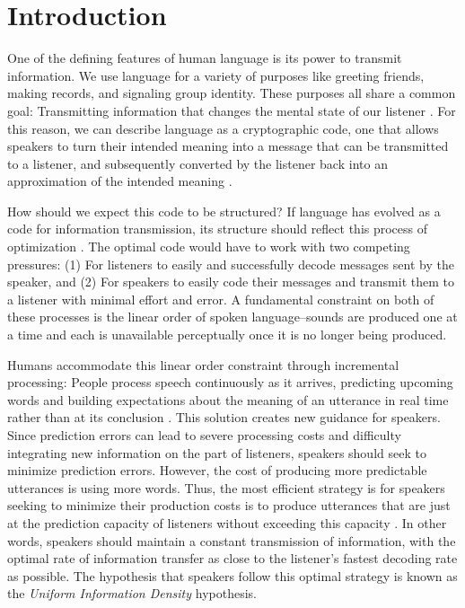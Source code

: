 \documentclass[entropy,article,submit,moreauthors,pdftex]{mdpi}
\begin{document}

\hypertarget{introduction}{%
\section{Introduction}\label{introduction}}

One of the defining features of human language is its power to transmit
information. We use language for a variety of purposes like greeting
friends, making records, and signaling group identity. These purposes
all share a common goal: Transmitting information that changes the
mental state of our listener \citep{austin1975}. For this reason, we can
describe language as a cryptographic code, one that allows speakers to
turn their intended meaning into a message that can be transmitted to a
listener, and subsequently converted by the listener back into an
approximation of the intended meaning \citep{shannon1948}.

How should we expect this code to be structured? If language has evolved
as a code for information transmission, its structure should reflect
this process of optimization \citep{anderson1989}. The optimal code
would have to work with two competing pressures: (1) For listeners to
easily and successfully decode messages sent by the speaker, and (2) For
speakers to easily code their messages and transmit them to a listener
with minimal effort and error. A fundamental constraint on both of these
processes is the linear order of spoken language--sounds are produced
one at a time and each is unavailable perceptually once it is no longer
being produced.

Humans accommodate this linear order constraint through incremental
processing: People process speech continuously as it arrives, predicting
upcoming words and building expectations about the meaning of an
utterance in real time rather than at its conclusion
\citep{kutas2011, tanenhaus1995, pickering2013}. This solution creates
new guidance for speakers. Since prediction errors can lead to severe
processing costs and difficulty integrating new information on the part
of listeners, speakers should seek to minimize prediction errors.
However, the cost of producing more predictable utterances is using more
words. Thus, the most efficient strategy is for speakers seeking to
minimize their production costs is to produce utterances that are just
at the prediction capacity of listeners without exceeding this capacity
\citep{aylett2004, genzel2002, levy2007}. In other words, speakers
should maintain a constant transmission of information, with the optimal
rate of information transfer as close to the listener's fastest decoding
rate as possible. The hypothesis that speakers follow this optimal
strategy is known as the \emph{Uniform Information Density} hypothesis.
\end{document}
